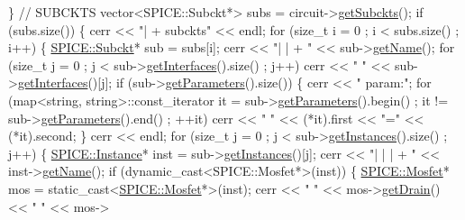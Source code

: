 \begin{DoxyCodeInclude}
    \}
    \textcolor{comment}{// SUBCKTS}
    vector<SPICE::Subckt*> subs = circuit->\mbox{\hyperlink{class_s_p_i_c_e_1_1_circuit_adcc4ca0de68f8ee05f0d5db3b7604930}{getSubckts}}();
    \textcolor{keywordflow}{if} (subs.size()) \{
        cerr << \textcolor{stringliteral}{"| + subckts"} << endl;
        \textcolor{keywordflow}{for} (\textcolor{keywordtype}{size\_t} i = 0 ; i < subs.size() ; i++) \{
            \mbox{\hyperlink{class_s_p_i_c_e_1_1_subckt}{SPICE::Subckt}}* sub = subs[i];
            cerr << \textcolor{stringliteral}{"| | + "} << sub->\mbox{\hyperlink{class_s_p_i_c_e_1_1_subckt_af55b1fe10eacd22c7ff3544b5ed32ef3}{getName}}(); 
            \textcolor{keywordflow}{for} (\textcolor{keywordtype}{size\_t} j = 0 ; j < sub->\mbox{\hyperlink{class_s_p_i_c_e_1_1_subckt_a5df00fe6eb5e287abef28c76ce88bd1e}{getInterfaces}}().size() ; j++)
                cerr << \textcolor{stringliteral}{" "} << sub->\mbox{\hyperlink{class_s_p_i_c_e_1_1_subckt_a5df00fe6eb5e287abef28c76ce88bd1e}{getInterfaces}}()[j];
            \textcolor{keywordflow}{if} (sub->\mbox{\hyperlink{class_s_p_i_c_e_1_1_subckt_aee7d59083b78d31ac5c19ab508da91e0}{getParameters}}().size()) \{
                cerr << \textcolor{stringliteral}{" param:"};
                \textcolor{keywordflow}{for} (map<string, string>::const\_iterator it = sub->\mbox{\hyperlink{class_s_p_i_c_e_1_1_subckt_aee7d59083b78d31ac5c19ab508da91e0}{getParameters}}().begin() ; 
      it != sub->\mbox{\hyperlink{class_s_p_i_c_e_1_1_subckt_aee7d59083b78d31ac5c19ab508da91e0}{getParameters}}().end() ; ++it)
                    cerr << \textcolor{stringliteral}{" "} << (*it).first << \textcolor{stringliteral}{"="} << (*it).second;
            \}
            cerr << endl;
            \textcolor{keywordflow}{for} (\textcolor{keywordtype}{size\_t} j = 0 ; j < sub->\mbox{\hyperlink{class_s_p_i_c_e_1_1_subckt_a8e6e58ffab876152a740092520c35d73}{getInstances}}().size() ; j++) \{
                \mbox{\hyperlink{class_s_p_i_c_e_1_1_instance}{SPICE::Instance}}* inst = sub->\mbox{\hyperlink{class_s_p_i_c_e_1_1_subckt_a8e6e58ffab876152a740092520c35d73}{getInstances}}()[j];
                cerr << \textcolor{stringliteral}{"| | | + "} << inst->\mbox{\hyperlink{class_s_p_i_c_e_1_1_instance_ac0fc966d4386ddb71d99361e3fccb311}{getName}}();
                \textcolor{keywordflow}{if} (dynamic\_cast<SPICE::Mosfet*>(inst)) \{
                    \mbox{\hyperlink{class_s_p_i_c_e_1_1_mosfet}{SPICE::Mosfet}}* mos = \textcolor{keyword}{static\_cast<}\mbox{\hyperlink{class_s_p_i_c_e_1_1_mosfet}{SPICE::Mosfet}}*\textcolor{keyword}{>}(inst);
                    cerr << \textcolor{stringliteral}{" "} << mos->\mbox{\hyperlink{class_s_p_i_c_e_1_1_mosfet_a7265f0565b8368070a3f09c6197a4e9b}{getDrain}}() << \textcolor{stringliteral}{" "} << mos->

\end{DoxyCodeInclude}
